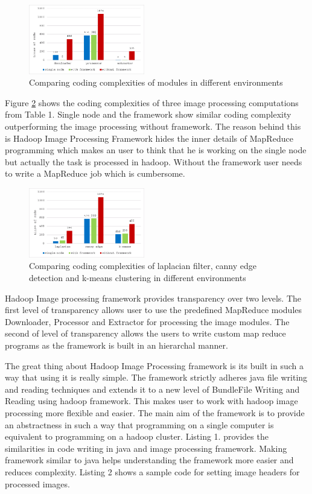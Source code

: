 \documentclass[conference]{IEEEtran}
\begin{document}
\begin{figure}[h]
	\centering
	\includegraphics[width=0.45\textwidth]{module-chart2}
	\caption{Comparing coding complexities of modules in different environments}
	\label{fig:module-chart}
\end{figure}

Figure \ref{fig:comp-chart} shows the coding complexities of three image processing computations from Table 1. Single node and the framework show similar coding complexity outperforming the image processing without framework. The reason behind this is Hadoop Image Processing Framework hides the inner details of MapReduce programming which makes an user to think that he is working on the single node but actually the task is processed in hadoop. Without the framework user needs to write a MapReduce job which is cumbersome. 


\begin{figure}[h]
	\centering
	\includegraphics[width=0.45\textwidth]{comp-chart}
	\caption{Comparing coding complexities of laplacian filter, canny edge detection and k-means clustering  in different environments}
	\label{fig:comp-chart}
\end{figure}


Hadoop Image processing framework provides transparency over two levels. The first level of transparency allows user to use the predefined MapReduce modules Downloader, Processor and Extractor for processing the image modules. The second of level of transparency allows the users to write custom map reduce programs as the framework is built in an hierarchal manner.

The great thing about Hadoop Image Processing framework is its built in such a way that using it is really simple. The framework strictly adheres java file writing and reading techniques and extends it to a new level of BundleFile Writing and Reading using hadoop framework. This makes user to work with hadoop image processing more flexible and easier. The main aim of the framework is to provide an abstractness in such a way that programming on a single computer is equivalent to programming on a hadoop cluster.  Listing 1. provides the similarities in code writing in java and image processing framework. Making framework similar to java helps understanding the framework more easier and reduces complexity. Listing 2 shows a sample code for setting image headers for processed images.
\end{document}
